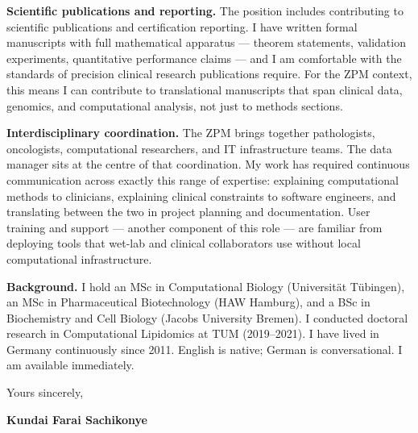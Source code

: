 \documentclass[12pt,a4paper]{article}
\begin{document}
\textbf{Scientific publications and reporting.}
The position includes contributing to scientific publications and
certification reporting.
I have written formal manuscripts with full mathematical apparatus ---
theorem statements, validation experiments, quantitative performance claims
--- and I am comfortable with the standards of precision clinical research
publications require.
For the ZPM context, this means I can contribute to translational
manuscripts that span clinical data, genomics, and computational analysis,
not just to methods sections.

\textbf{Interdisciplinary coordination.}
The ZPM brings together pathologists, oncologists, computational researchers,
and IT infrastructure teams.
The data manager sits at the centre of that coordination.
My work has required continuous communication across exactly this range
of expertise: explaining computational methods to clinicians, explaining
clinical constraints to software engineers, and translating between the
two in project planning and documentation.
User training and support --- another component of this role --- are familiar
from deploying tools that wet-lab and clinical collaborators use without
local computational infrastructure.

\textbf{Background.}
I hold an MSc in Computational Biology (Universität Tübingen), an MSc in
Pharmaceutical Biotechnology (HAW Hamburg), and a BSc in Biochemistry and
Cell Biology (Jacobs University Bremen).
I conducted doctoral research in Computational Lipidomics at TUM (2019--2021).
I have lived in Germany continuously since 2011.
English is native; German is conversational.
I am available immediately.

\vspace{1.5em}
Yours sincerely,

\vspace{2.5em}
\textbf{Kundai Farai Sachikonye}
\end{document}
